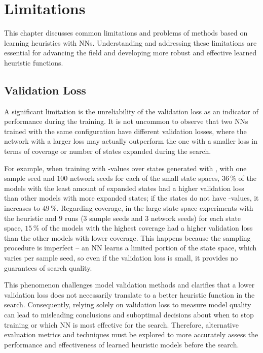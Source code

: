 \chapter{Limitations}
\label{sec:limitations}

This chapter discusses common limitations and problems of methods based on learning heuristics with NNs. Understanding and addressing these limitations are essential for advancing the field and developing more robust and effective learned heuristic functions.

\section{Validation Loss}
\label{sec:validation-loss}

A significant limitation is the unreliability of the validation loss as an indicator of performance during the training. It is not uncommon to observe that two NNs trained with the same configuration have different validation losses, where the network with a larger loss may actually outperform the one with a smaller loss in terms of coverage or number of states expanded during the search.

For example, when training with \hstar-values over states generated with \bfsrw, with one sample seed and $100$ network seeds for each of the small state spaces, $36\,\%$ of the models with the least amount of expanded states had a higher validation loss than other models with more expanded states; if the states do not have \hstar-values, it increases to $49\,\%$. Regarding coverage, in the large state space experiments with the heuristic \hnnrs and $9$ runs ($3$ sample seeds and $3$ network seeds) for each state space, $15\,\%$ of the models with the highest coverage had a higher validation loss than the other models with lower coverage. This happens because the sampling procedure is imperfect -- an NN learns a limited portion of the state space, which varies per sample seed, so even if the validation loss is small, it provides no guarantees of search quality.

This phenomenon challenges model validation methods and clarifies that a lower validation loss does not necessarily translate to a better heuristic function in the search. Consequently, relying solely on validation loss to measure model quality can lead to misleading conclusions and suboptimal decisions about when to stop training or which NN is most effective for the search. Therefore, alternative evaluation metrics and techniques must be explored to more accurately assess the performance and effectiveness of learned heuristic models before the search.

